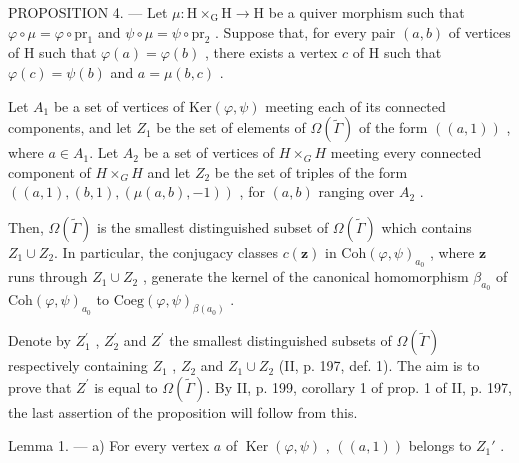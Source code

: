 PROPOSITION 4. --- Let \(\mu\colon\mathrm{H}\times_{\mathrm{G}}\mathrm{H}\to\mathrm{H}\) be a quiver morphism such that \(\varphi\circ\mu=\varphi\circ\mathrm{pr}_{1}\) and \(\psi\circ\mu=\psi\circ\mathrm{pr}_{2}\) . Suppose that, for every pair \((a,b)\) of vertices of H such that \(\varphi(a)=\varphi(b)\) , there exists a vertex \(c\) of H such that \(\varphi(c)=\psi(b)\) and \(a=\mu(b,c)\) .

  Let \(A_{1}\) be a set of vertices of \(\mathrm{Ker}(\varphi,\psi)\) meeting each of its connected components, and let \(Z_{1}\) be the set of elements of \(\Omega(\widetilde{\Gamma})\) of the form \(((a,1))\) , where \(a\in A_{1}\). Let \(A_{2}\) be a set of vertices of \(H\times_{G}H\) meeting every connected component of \(H\times_{G}H\) and let \(Z_{2}\) be the set of triples of the form \(((a,1),(b,1),(\mu(a,b),-1))\) , for \((a,b)\) ranging over \(A_{2}\) .

Then, \(\Omega(\widetilde{\Gamma})\) is the smallest distinguished subset of \(\Omega(\widetilde{\Gamma})\) which contains \(Z_1 \cup Z_2\). In particular, the conjugacy classes \(c(\mathbf{z})\) in \(\mathrm{Coh}(\varphi, \psi)_{a_0}\) , where \(\mathbf{z}\) runs through \(Z_1 \cup Z_2\) , generate the kernel of the canonical homomorphism \(\beta_{a_0}\) of \(\mathrm{Coh}(\varphi, \psi)_{a_0}\) to \(\mathrm{Coeg}(\varphi, \psi)_{\beta(a_0)}\) .

Denote by \(Z_{1}^{\prime}\) , \(Z_{2}^{\prime}\) and \(Z^{\prime}\) the smallest distinguished subsets of \(\Omega(\widetilde{\Gamma})\) respectively containing \(Z_{1}\) , \(Z_{2}\) and \(Z_{1} \cup Z_{2}\) (II, p. 197, def. 1). The aim is to prove that \(Z^{\prime}\) is equal to \(\Omega(\widetilde{\Gamma})\). By II, p. 199, corollary 1 of prop. 1 of II, p. 197, the last assertion of the proposition will follow from this.

Lemma 1. --- a) For every vertex \(a\) of \(\operatorname{Ker}(\varphi, \psi)\) , \(((a, 1))\) belongs to \(Z_1'\) .

